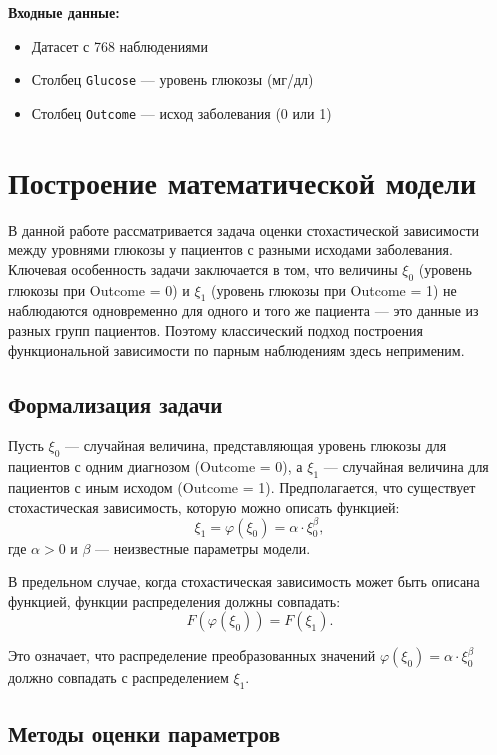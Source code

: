 \documentclass[a4paper, 14pt]{extarticle}
\begin{document}
\textbf{Входные данные:}
\begin{itemize}
  \item Датасет с 768 наблюдениями
  \item Столбец \texttt{Glucose} --- уровень глюкозы (мг/дл)
  \item Столбец \texttt{Outcome} --- исход заболевания (0 или 1)
\end{itemize}

\section{Построение математической модели}

В данной работе рассматривается задача оценки стохастической зависимости между уровнями глюкозы у пациентов с разными исходами заболевания. Ключевая особенность задачи заключается в том, что величины $\xi_0$ (уровень глюкозы при Outcome = 0) и $\xi_1$ (уровень глюкозы при Outcome = 1) не наблюдаются одновременно для одного и того же пациента --- это данные из разных групп пациентов. Поэтому классический подход построения функциональной зависимости по парным наблюдениям здесь неприменим.

\subsection{Формализация задачи}

Пусть $\xi_0$ --- случайная величина, представляющая уровень глюкозы для пациентов с одним диагнозом (Outcome = 0), а $\xi_1$ --- случайная величина для пациентов с иным исходом (Outcome = 1). Предполагается, что существует стохастическая зависимость, которую можно описать функцией:
\[
\xi_1 = \varphi(\xi_0) = \alpha \cdot \xi_0^{\beta},
\]
где $\alpha > 0$ и $\beta$ --- неизвестные параметры модели.

В предельном случае, когда стохастическая зависимость может быть описана функцией, функции распределения должны совпадать:
\[
F(\varphi(\xi_0)) = F(\xi_1).
\]

Это означает, что распределение преобразованных значений $\varphi(\xi_0) = \alpha \cdot \xi_0^{\beta}$ должно совпадать с распределением $\xi_1$.

\subsection{Методы оценки параметров}
\end{document}
